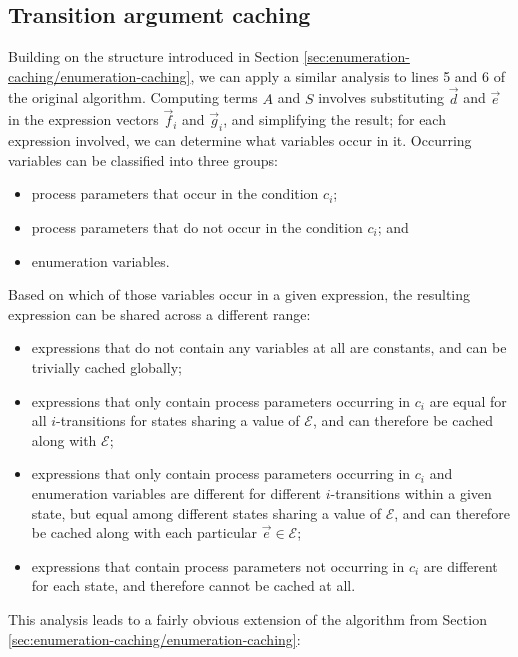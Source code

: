\documentclass[a4paper]{article}
\begin{document}
\subsection{Transition argument caching}
\label{sec:enumeration-caching/transition-argument-caching}
Building on the structure introduced in Section \ref{sec:enumeration-caching/enumeration-caching}, we can apply a similar analysis to lines 5 and 6 of the original algorithm. Computing terms $A$ and $S$ involves substituting $\vec{d}$ and $\vec{e}$ in the expression vectors $\vec{f}_i$ and $\vec{g}_i$, and simplifying the result; for each expression involved, we can determine what variables occur in it. Occurring variables can be classified into three groups:
\begin{itemize}
 \item process parameters that occur in the condition $c_i$;
 \item process parameters that do not occur in the condition $c_i$; and
 \item enumeration variables.
\end{itemize}
Based on which of those variables occur in a given expression, the resulting expression can be shared across a different range:
\begin{itemize}
 \item expressions that do not contain any variables at all are constants, and can be trivially cached globally;
 \item expressions that only contain process parameters occurring in $c_i$ are equal for all $i$-transitions for states sharing a value of $\mathcal{E}$, and can therefore be cached along with $\mathcal{E}$;
 \item expressions that only contain process parameters occurring in $c_i$ and enumeration variables are different for different $i$-transitions within a given state, but equal among different states sharing a value of $\mathcal{E}$, and can therefore be cached along with each particular $\vec{e} \in \mathcal{E}$;
 \item expressions that contain process parameters not occurring in $c_i$ are different for each state, and therefore cannot be cached at all.
\end{itemize}
This analysis leads to a fairly obvious extension of the algorithm from Section \ref{sec:enumeration-caching/enumeration-caching}:
\end{document}
